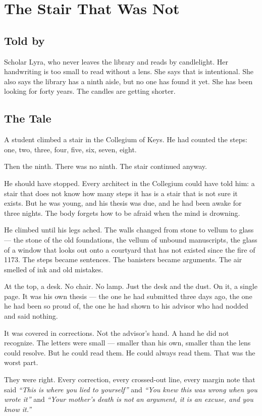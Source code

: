 \chapter{The Stair That Was Not}

\section*{Told by}
Scholar Lyra, who never leaves the library and reads by candlelight. Her handwriting is too small to read without a lens. She says that is intentional. She also says the library has a ninth aisle, but no one has found it yet. She has been looking for forty years. The candles are getting shorter.

\section*{The Tale}

A student climbed a stair in the Collegium of Keys. He had counted the steps: one, two, three, four, five, six, seven, eight.

Then the ninth. There was no ninth. The stair continued anyway.

He should have stopped. Every architect in the Collegium could have told him: a stair that does not know how many steps it has is a stair that is not sure it exists. But he was young, and his thesis was due, and he had been awake for three nights. The body forgets how to be afraid when the mind is drowning.

He climbed until his legs ached. The walls changed from stone to vellum to glass — the stone of the old foundations, the vellum of unbound manuscripts, the glass of a window that looks out onto a courtyard that has not existed since the fire of 1173. The steps became sentences. The banisters became arguments. The air smelled of ink and old mistakes.

At the top, a desk. No chair. No lamp. Just the desk and the dust. On it, a single page. It was his own thesis — the one he had submitted three days ago, the one he had been so proud of, the one he had shown to his advisor who had nodded and said nothing.

It was covered in corrections. Not the advisor's hand. A hand he did not recognize. The letters were small — smaller than his own, smaller than the lens could resolve. But he could read them. He could always read them. That was the worst part.

They were right. Every correction, every crossed-out line, every margin note that said \textit{``This is where you lied to yourself''} and \textit{``You knew this was wrong when you wrote it''} and \textit{``Your mother's death is not an argument, it is an excuse, and you know it.''}

